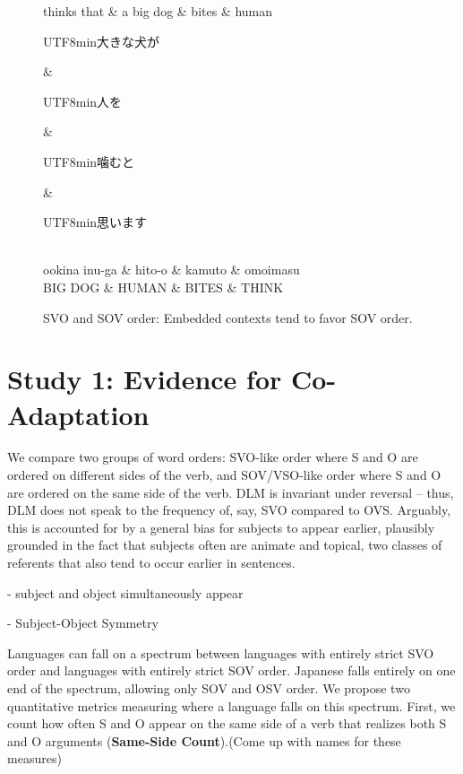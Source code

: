 \documentclass[11pt,a4paper]{article}
\newcommand{\japanese}[1]{\begin{CJK}{UTF8}{min}#1\end{CJK}}
\newcommand{\key}[1]{\textbf{#1}}
\newcommand\mhahn[1]{{\color{red}(#1)}}
\begin{document}
\begin{figure}[ht]
\begin{dependency}[theme = simple]
   \begin{deptext}[column sep=1em]
       thinks that \& a big dog \& bites \& human  \\
   \end{deptext}
\end{dependency}
\begin{dependency}[theme = simple]
   \begin{deptext}[column sep=1em]
   \japanese{大きな犬が} \& \japanese{人を} \& \japanese{噛むと} \& \japanese{思います}\\ 
   ookina inu-ga \& hito-o \& kamuto \& omoimasu \\
         BIG DOG \& HUMAN \& BITES \& THINK \\
   \end{deptext}
\end{dependency}
        \caption{SVO and SOV order: Embedded contexts tend to favor SOV order.}
        \label{fig:sent-dep}
\end{figure}


\section{Study 1: Evidence for Co-Adaptation}

We compare two groups of word orders: SVO-like order where S and O are ordered on different sides of the verb, and SOV/VSO-like order where S and O are ordered on the same side of the verb.
DLM is invariant under reversal -- thus, DLM does not speak to the frequency of, say, SVO compared to OVS.
Arguably, this is accounted for by a general bias for subjects to appear earlier, plausibly grounded in the fact that subjects often are animate and topical, two classes of referents that also tend to occur earlier in sentences.

- subject and object simultaneously appear

- Subject-Object Symmetry

Languages can fall on a spectrum between languages with entirely strict SVO order and languages with entirely strict SOV order.
Japanese falls entirely on one end of the spectrum, allowing only SOV and OSV order.
We propose two quantitative metrics measuring where a language falls on this spectrum.
First, we count how often S and O appear on the same side of a verb that realizes both S and O arguments (\key{Same-Side Count}).\mhahn{Come up with names for these measures}
\end{document}
